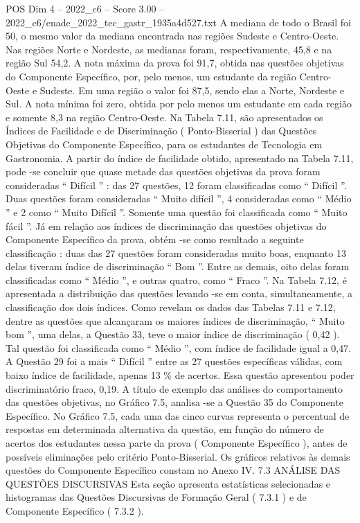 \begin{textsample}{POS Dim 4 – 2022\_c6 – Score 3.00 – 2022\_c6/enade\_2022\_tec\_gastr\_1935a4d527.txt}
A mediana de todo o Brasil foi 50, o mesmo valor da mediana encontrada nas regiões Sudeste e Centro-Oeste.
Nas regiões Norte e Nordeste, as medianas foram, respectivamente, 45,8 e na região Sul 54,2.
A nota máxima da prova foi 91,7, obtida nas questões objetivas do Componente Específico, por, pelo menos, um estudante da região Centro-Oeste e Sudeste.
Em uma região o valor foi 87,5, sendo elas a Norte, Nordeste e Sul.
A nota mínima foi zero, obtida por pelo menos um estudante em cada região e somente 8,3 na região Centro-Oeste.
Na Tabela 7.11, são apresentados os Índices de Facilidade e de Discriminação ( Ponto-Bisserial ) das Questões Objetivas do Componente Específico, para os estudantes de Tecnologia em Gastronomia.
A partir do índice de facilidade obtido, apresentado na Tabela 7.11, pode -se concluir que quase metade das questões objetivas da prova foram consideradas “ Difícil ” : das 27 questões, 12 foram classificadas como “ Difícil ”.
Duas questões foram consideradas “ Muito difícil ”, 4 consideradas como “ Médio ” e 2 como “ Muito Difícil ”.
Somente uma questão foi classificada como “ Muito fácil ”.
Já em relação aos índices de discriminação das questões objetivas do Componente Específico da prova, obtém -se como resultado a seguinte classificação : duas das 27 questões foram consideradas muito boas, enquanto 13 delas tiveram índice de discriminação “ Bom ”.
Entre as demais, oito delas foram classificadas como “ Médio ”, e outras quatro, como “ Fraco ”.
Na Tabela 7.12, é apresentada a distribuição das questões levando -se em conta, simultaneamente, a classificação dos dois índices.
Como revelam os dados das Tabelas 7.11 e 7.12, dentre as questões que alcançaram os maiores índices de discriminação, “ Muito bom ”, uma delas, a Questão 33, teve o maior índice de discriminação ( 0,42 ).
Tal questão foi classificada como “ Médio ”, com índice de facilidade igual a 0,47.
A Questão 29 foi a mais “ Difícil ” entre as 27 questões específicas válidas, com baixo índice de facilidade, apenas 13 \% de acertos.
Essa questão apresentou poder discriminatório fraco, 0,19.
A título de exemplo das análises do comportamento das questões objetivas, no Gráfico 7.5, analisa -se a Questão 35 do Componente Específico.
No Gráfico 7.5, cada uma das cinco curvas representa o percentual de respostas em determinada alternativa da questão, em função do número de acertos dos estudantes nessa parte da prova ( Componente Específico ), antes de possíveis eliminações pelo critério Ponto-Bisserial.
Os gráficos relativos às demais questões do Componente Específico constam no Anexo IV. 7.3 ANÁLISE DAS QUESTÕES DISCURSIVAS Esta seção apresenta estatísticas selecionadas e histogramas das Questões Discursivas de Formação Geral ( 7.3.1 ) e de Componente Específico ( 7.3.2 ).

\end{textsample}
